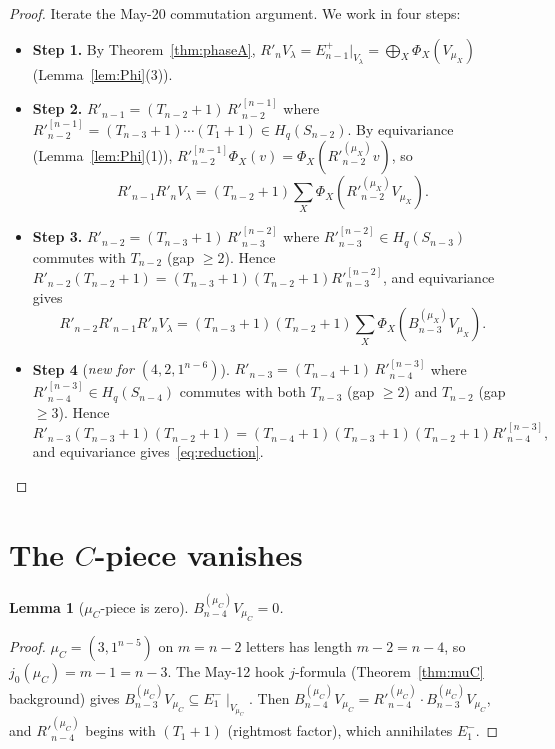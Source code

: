 \documentclass[11pt]{article}
\newtheorem{lemma}[theorem]{Lemma}
\theoremstyle{definition}
\begin{document}
\begin{proof}
Iterate the May-20 commutation argument. We work in four steps:
\begin{itemize}[leftmargin=2em]
\item \textbf{Step 1.} By Theorem~\ref{thm:phaseA}, $R'_n V_\lambda
= E_{n-1}^+|_{V_\lambda} = \bigoplus_X \Phi_X(V_{\mu_X})$
(Lemma~\ref{lem:Phi}(3)).
\item \textbf{Step 2.} $R'_{n-1} = (T_{n-2}{+}1)\, R'^{[n-1]}_{n-2}$
where $R'^{[n-1]}_{n-2} = (T_{n-3}{+}1)\cdots(T_1{+}1) \in
H_q(S_{n-2})$. By equivariance
(Lemma~\ref{lem:Phi}(1)), $R'^{[n-1]}_{n-2} \Phi_X(v) =
\Phi_X(R'^{(\mu_X)}_{n-2} v)$, so
\[
   R'_{n-1} R'_n V_\lambda = (T_{n-2}{+}1) \sum_X
   \Phi_X(R'^{(\mu_X)}_{n-2} V_{\mu_X}).
\]
\item \textbf{Step 3.} $R'_{n-2} = (T_{n-3}{+}1)\, R'^{[n-2]}_{n-3}$
where $R'^{[n-2]}_{n-3} \in H_q(S_{n-3})$ commutes with $T_{n-2}$
(gap $\ge 2$). Hence $R'_{n-2}(T_{n-2}{+}1) =
(T_{n-3}{+}1)(T_{n-2}{+}1) R'^{[n-2]}_{n-3}$, and equivariance
gives
\[
   R'_{n-2} R'_{n-1} R'_n V_\lambda = (T_{n-3}{+}1)(T_{n-2}{+}1)
   \sum_X \Phi_X(B^{(\mu_X)}_{n-3} V_{\mu_X}).
\]
\item \textbf{Step 4} (\emph{new for $(4, 2, 1^{n-6})$}).
$R'_{n-3} = (T_{n-4}{+}1)\, R'^{[n-3]}_{n-4}$ where
$R'^{[n-3]}_{n-4} \in H_q(S_{n-4})$ commutes with both $T_{n-3}$
(gap $\ge 2$) and $T_{n-2}$ (gap $\ge 3$). Hence
\[
   R'_{n-3} (T_{n-3}{+}1)(T_{n-2}{+}1) =
   (T_{n-4}{+}1)(T_{n-3}{+}1)(T_{n-2}{+}1) R'^{[n-3]}_{n-4},
\]
and equivariance gives~\eqref{eq:reduction}.\qedhere
\end{itemize}
\end{proof}

\section{The $C$-piece vanishes}\label{sec:C}

\begin{lemma}[$\mu_C$-piece is zero]\label{lem:C-zero}
$B_{n-4}^{(\mu_C)} V_{\mu_C} = 0$.
\end{lemma}

\begin{proof}
$\mu_C = (3, 1^{n-5})$ on $m = n - 2$ letters has length
$m - 2 = n - 4$, so $j_0(\mu_C) = m - 1 = n - 3$. The May-12 hook
$j$-formula (Theorem~\ref{thm:muC} background) gives
$B_{n-3}^{(\mu_C)} V_{\mu_C} \subseteq E_1^-\!\mid_{V_{\mu_C}}$.
Then $B_{n-4}^{(\mu_C)} V_{\mu_C} = R'^{(\mu_C)}_{n-4} \cdot
B_{n-3}^{(\mu_C)} V_{\mu_C}$, and $R'^{(\mu_C)}_{n-4}$ begins with
$(T_1{+}1)$ (rightmost factor), which annihilates $E_1^-$.
\end{proof}
\end{document}

